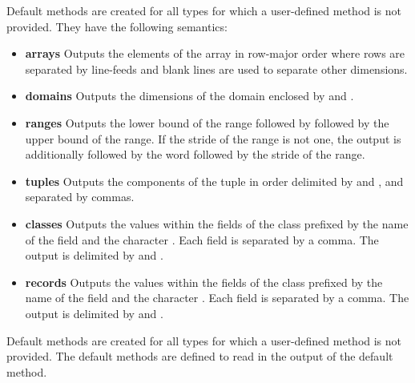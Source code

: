 Default  methods are created for all types for which a user-defined
 method is not provided.  They have the following semantics:
\begin{itemize}
\item
{\bf arrays} Outputs the elements of the array in row-major order
where rows are separated by line-feeds and blank lines are used to
separate other dimensions.
\item
{\bf domains} Outputs the dimensions of the domain enclosed
by \chpl{[} and \chpl{]}.
\item
{\bf ranges} Outputs the lower bound of the range followed
by  followed by the upper bound of the range.  If the stride
of the range is not one, the output is additionally followed by the
word  followed by the stride of the range.
\item
{\bf tuples} Outputs the components of the tuple in order delimited
by \chpl{(} and \chpl{)}, and separated by commas.
\item
{\bf classes} Outputs the values within the fields of the class
prefixed by the name of the field and the character \chpl{=}.  Each
field is separated by a comma.  The output is delimited by \chpl{\{}
and \chpl{\}}.
\item
{\bf records} Outputs the values within the fields of the class
prefixed by the name of the field and the character \chpl{=}.  Each
field is separated by a comma.  The output is delimited by \chpl{(}
and \chpl{)}.
\end{itemize}

Default  methods are created for all types for which a user-defined
 method is not provided.  The default  methods are
defined to read in the output of the default  method.
